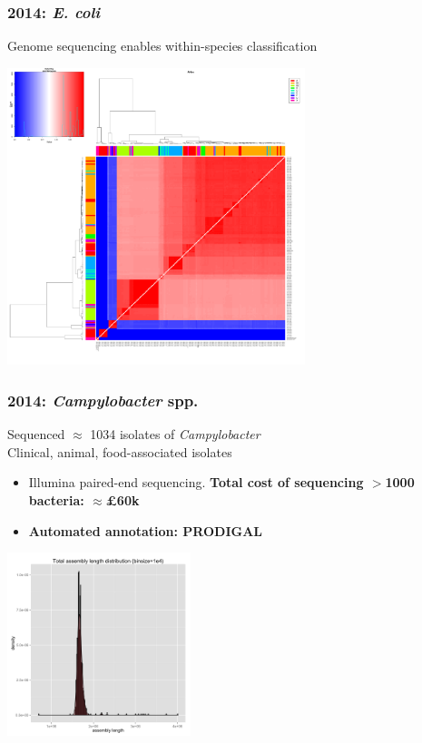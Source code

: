 \begin{frame}
  \frametitle{2014: \textit{E. coli}}
  Genome sequencing enables within-species classification
  \begin{center}
    \includegraphics[width=0.65\textwidth]{images/ANIm_Ecoli}
  \end{center}      
\end{frame}

\begin{frame}
  \frametitle{2014: \textit{Campylobacter} spp.}
  Sequenced $\approx$ 1034 isolates of \textit{Campylobacter} \\
  Clinical, animal, food-associated isolates
  \begin{itemize}
    \item Illumina paired-end sequencing. \textbf{Total cost of sequencing $>$1000 bacteria: $\approx$\pounds60k}
    \item \textbf{Automated annotation: PRODIGAL}    
  \end{itemize}      
  \begin{center}
    \includegraphics[width=0.4\textwidth]{images/Asm_long_contigs_length_histogram}
  \end{center}        
\end{frame}

